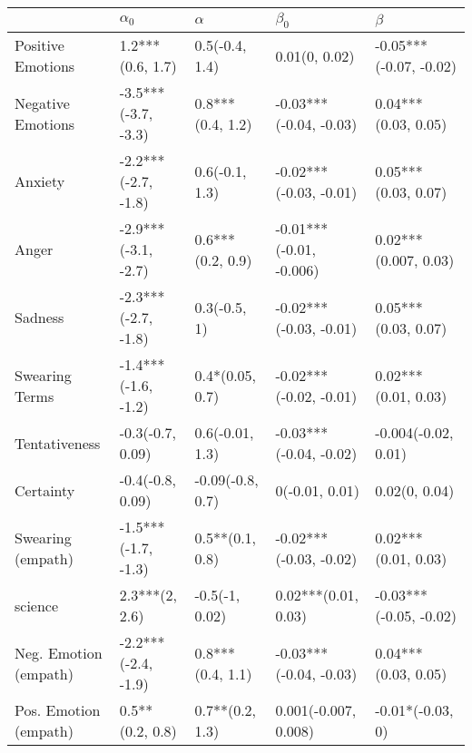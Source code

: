 \begin{tabular}{lllll}
\toprule
{} &           $\alpha_0$ &          $\alpha$ &                $\beta_0$ &                 $\beta$ \\
\midrule
Positive Emotions     &     1.2***(0.6, 1.7) &    0.5(-0.4, 1.4) &            0.01(0, 0.02) &  -0.05***(-0.07, -0.02) \\
Negative Emotions     &  -3.5***(-3.7, -3.3) &  0.8***(0.4, 1.2) &   -0.03***(-0.04, -0.03) &     0.04***(0.03, 0.05) \\
Anxiety               &  -2.2***(-2.7, -1.8) &    0.6(-0.1, 1.3) &   -0.02***(-0.03, -0.01) &     0.05***(0.03, 0.07) \\
Anger                 &  -2.9***(-3.1, -2.7) &  0.6***(0.2, 0.9) &  -0.01***(-0.01, -0.006) &    0.02***(0.007, 0.03) \\
Sadness               &  -2.3***(-2.7, -1.8) &      0.3(-0.5, 1) &   -0.02***(-0.03, -0.01) &     0.05***(0.03, 0.07) \\
Swearing Terms        &  -1.4***(-1.6, -1.2) &   0.4*(0.05, 0.7) &   -0.02***(-0.02, -0.01) &     0.02***(0.01, 0.03) \\
Tentativeness         &     -0.3(-0.7, 0.09) &   0.6(-0.01, 1.3) &   -0.03***(-0.04, -0.02) &     -0.004(-0.02, 0.01) \\
Certainty             &     -0.4(-0.8, 0.09) &  -0.09(-0.8, 0.7) &           0(-0.01, 0.01) &           0.02(0, 0.04) \\
Swearing (empath)     &  -1.5***(-1.7, -1.3) &   0.5**(0.1, 0.8) &   -0.02***(-0.03, -0.02) &     0.02***(0.01, 0.03) \\
science               &       2.3***(2, 2.6) &    -0.5(-1, 0.02) &      0.02***(0.01, 0.03) &  -0.03***(-0.05, -0.02) \\
Neg. Emotion (empath) &  -2.2***(-2.4, -1.9) &  0.8***(0.4, 1.1) &   -0.03***(-0.04, -0.03) &     0.04***(0.03, 0.05) \\
Pos. Emotion (empath) &      0.5**(0.2, 0.8) &   0.7**(0.2, 1.3) &     0.001(-0.007, 0.008) &        -0.01*(-0.03, 0) \\
\bottomrule
\end{tabular}
